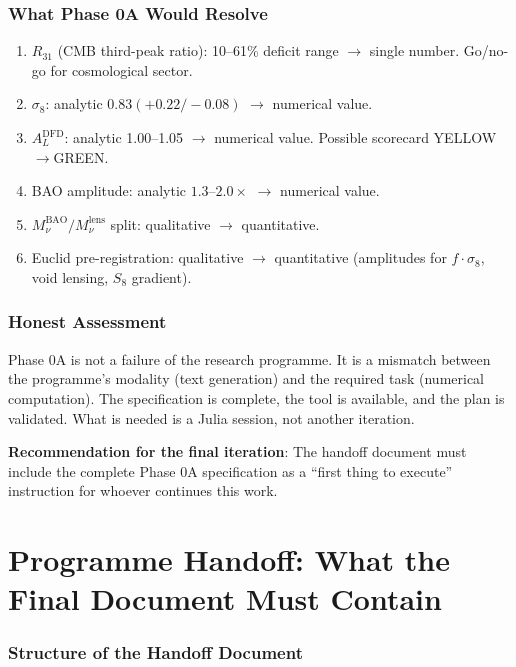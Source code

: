 \documentclass[11pt,a4paper]{article}
\begin{document}
\section{What Phase 0A Would Resolve}

\begin{enumerate}
\item $R_{31}$ (CMB third-peak ratio): 10--61\% deficit range $\to$ single number. Go/no-go for cosmological sector.
\item $\sigma_8$: analytic $0.83 (+0.22/-0.08)$ $\to$ numerical value.
\item $A_L^{\text{DFD}}$: analytic 1.00--1.05 $\to$ numerical value. Possible scorecard YELLOW$\to$GREEN.
\item BAO amplitude: analytic $1.3$--$2.0\times$ $\to$ numerical value.
\item $M_\nu^{\text{BAO}} / M_\nu^{\text{lens}}$ split: qualitative $\to$ quantitative.
\item Euclid pre-registration: qualitative $\to$ quantitative (amplitudes for $f \cdot \sigma_8$, void lensing, $S_8$ gradient).
\end{enumerate}

\section{Honest Assessment}

Phase 0A is not a failure of the research programme. It is a mismatch between the programme's modality (text generation) and the required task (numerical computation). The specification is complete, the tool is available, and the plan is validated. What is needed is a Julia session, not another iteration.

\textbf{Recommendation for the final iteration}: The handoff document must include the complete Phase 0A specification as a ``first thing to execute'' instruction for whoever continues this work.


\part{Programme Handoff: What the Final Document Must Contain}

\section{Structure of the Handoff Document}
\end{document}
